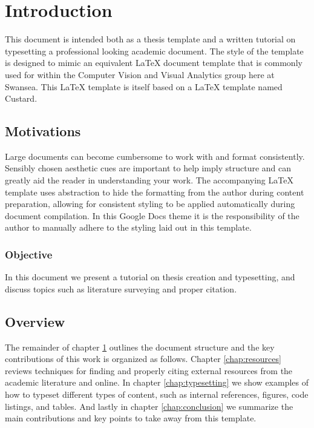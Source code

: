 \chapter{Introduction}
	\label{chap:intro}
	
	This document is intended both as a thesis template and a written tutorial on typesetting a professional looking academic document. The style of the template is designed to mimic an equivalent LaTeX document template that is commonly used for within the Computer Vision and Visual Analytics group here at Swansea. This LaTeX template is itself based on a LaTeX template named Custard. 
	
	\section{Motivations}
		\label{sec:intro_motivation} 
		
		Large documents can become cumbersome to work with and format consistently. Sensibly chosen aesthetic cues are important to help imply structure and can greatly aid the reader in understanding your work. The accompanying LaTeX template uses abstraction to hide the formatting from the author during content preparation, allowing for consistent styling to be applied automatically during document compilation. In this Google Docs theme it is the responsibility of the author to manually adhere to the styling laid out in this template.
	
	\subsection{Objective}
		\label{sec:intro_objective} 
		
		In this document we present a tutorial on thesis creation and typesetting, and discuss topics such as literature surveying and proper citation. 
		
	\section{Overview}  
		\label{sec:intro_overview} 
		
		The remainder of chapter \ref{chap:intro} outlines the document structure and the key contributions of this work is organized as follows. Chapter \ref{chap:resources} reviews techniques for finding and properly citing external resources from the academic literature and online. In chapter \ref{chap:typesetting} we show examples of how to typeset different types of content, such as internal references, figures, code listings, and tables. And lastly in chapter \ref{chap:conclusion} we summarize the main contributions and key points to take away from this template.
	
